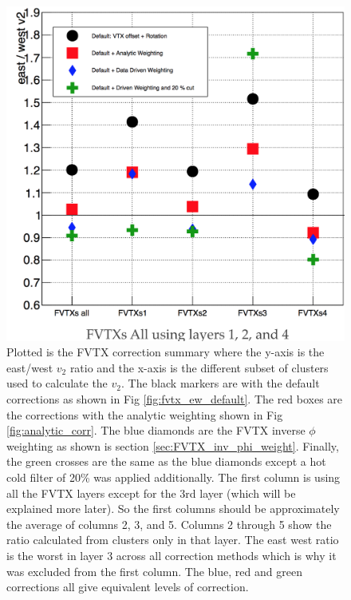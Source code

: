 \begin{figure}[!h]
\begin{center}
\includegraphics[width=0.5\linewidth]{figs/fvtx_correction_summary.png}
\caption{Plotted is the FVTX correction summary where the y-axis is the east/west $v_2$ ratio and the x-axis is the different subset of clusters used to calculate the $v_2$. The black markers are with the default corrections as shown in Fig \ref{fig:fvtx_ew_default}. The red boxes are the corrections with the analytic weighting shown in Fig \ref{fig:analytic_corr}. The blue diamonds are the FVTX inverse $\phi$ weighting as shown is section \ref{sec:FVTX_inv_phi_weight}. Finally, the green crosses are the same as the blue diamonds except a hot cold filter of 20\% was applied additionally. The first column is using all the FVTX layers except for the 3rd layer (which will be explained more later). So the first columns should be approximately the average of columns 2, 3, and 5. Columns 2 through 5 show the ratio calculated from clusters only in that layer. The east west ratio is the worst in layer 3 across all correction methods which is why it was excluded from the first column. The blue, red and green corrections all give equivalent levels of correction.}
\label{fig:fvtx_corr_summary}
\end{center}
\end{figure}

